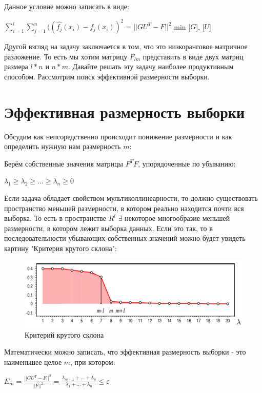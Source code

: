  Данное условие можно записать в виде: \par
 $\displaystyle\sum_{i=1}^{l}\displaystyle\sum_{j=1}^{n} ((\hat{f_j}(x_i)-f_j(x_i))^2 = ||GU^T - F||^2$ \rightarrow min [$G$], [$U$]

Другой взгляд на задачу заключается в том, что это низкоранговое матричное разложение. То есть мы хотим матрицу $F_{lm}$ представить в виде двух матриц размера $l*n$ и $n*m$. Давайте решать эту задачу наиболее продуктивным способом. Рассмотрим поиск эффективной размерности выборки.

\section{Эффективная размерность выборки}
Обсудим как непсоредственно происходит понижение размерности и как определить нужную нам размерность $m$: \par

Берём собственные значения матрицы $F^TF$, упорядоченные по убыванию: \par
$\lambda_1 \geq \lambda_2 \geq \dotsc \geq \lambda_n \geq 0$ \par

Если задача обладает свойством мультиколлинеарности, то должно существовать пространство меньшей размерности, в котором реально находится почти вся выборка. То есть в пространстве $R^l$ $\exists$ некоторое многообразие меньшей размерности, в котором лежит выборка данных. Если это так, то в последовательности убывающих собственных значений можно будет увидеть картину "Критерия крутого склона": \par

\begin{figure}[h]
    \centering
    \includegraphics[width=1\linewidth]{Снимок экрана 2024-12-14 214833.png}
    \caption{Критерий крутого склона}
    \label{fig:enter-label}
\end{figure}

Математически можно записать, что эффективная размерность выборки - это наименьшее целое $m$, при котором: \par
$E_m = \frac{||GU^T-F||^2}{||F||^2} = \frac{\lambda_{m+1} + \dots + \lambda_{n}}{\lambda_{1} + \dots + \lambda_{n}} \leq \varepsilon$ \par

